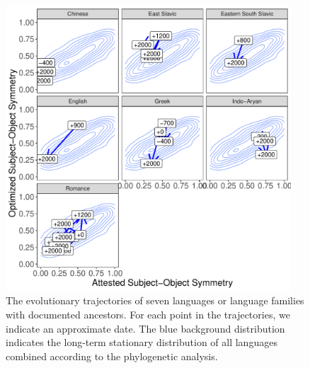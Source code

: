 \documentclass[11pt,a4paper]{article}
\begin{document}
\begin{figure}
    \centering
    \includegraphics[width=0.95\textwidth]{../analysis/figures/historical_2.6_times_stationary.pdf}
    \caption{The evolutionary trajectories of seven languages or language families with documented ancestors. For each point in the trajectories, we indicate an approximate date. The blue background distribution indicates the long-term stationary distribution of all languages combined according to the phylogenetic analysis. }
    \label{fig:historical}
\end{figure}
\end{document}
